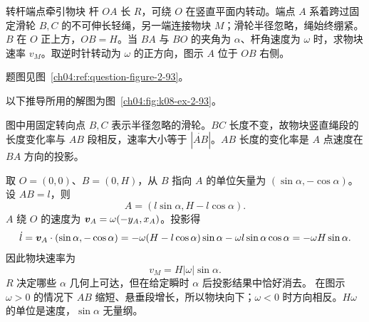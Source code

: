 {\begin{origexamplebox}{转杆端点牵引物块}\label{ch04:ex:k08-2-93}
杆 $OA$ 长 $R$，可绕 $O$ 在竖直平面内转动。端点 $A$ 系着跨过固定滑轮 $B,C$ 的不可伸长轻绳，另一端连接物块 $M$；滑轮半径忽略，绳始终绷紧。$B$ 在 $O$ 正上方，$OB=H$。当 $BA$ 与 $BO$ 的夹角为 $\alpha$、杆角速度为 $\omega$ 时，求物块速率 $v_M$。取逆时针转动为 $\omega$ 的正方向，图示 $A$ 位于 $OB$ 右侧。
\par 题图见图~\ref{ch04:ref:question-figure-2-93}。
\KQuestionDP
\end{origexamplebox}
\begin{xesolution}
以下推导所用的解图为图~\ref{ch04:fig:k08-ex-2-93}。

图中用固定转向点 $B,C$ 表示半径忽略的滑轮。$BC$ 长度不变，故物块竖直绳段的长度变化率与 $AB$ 段相反，速率大小等于 $|\dot{AB}|$。$AB$ 长度的变化率是 $A$ 点速度在 $BA$ 方向的投影。
\RodPulleyDiagram

取 $O=(0,0)$、$B=(0,H)$，从 $B$ 指向 $A$ 的单位矢量为 $(\sin\alpha,-\cos\alpha)$。设 $AB=l$，则
\[
A=(l\sin\alpha,H-l\cos\alpha).
\]
$A$ 绕 $O$ 的速度为 $\bm{v}_A=\omega(-y_A,x_A)$。投影得
\[
\dot l=\bm{v}_A\cdot(\sin\alpha,-\cos\alpha)
=-\omega(H-l\cos\alpha)\sin\alpha
-\omega l\sin\alpha\cos\alpha
=-\omega H\sin\alpha.
\]
因此物块速率为
\[
\boxed{v_M=H|\omega|\sin\alpha}.
\]
$R$ 决定哪些 $\alpha$ 几何上可达，但在给定瞬时 $\alpha$ 后投影结果中恰好消去。
在图示 $\omega>0$ 的情况下 $AB$ 缩短、悬垂段增长，所以物块向下；$\omega<0$ 时方向相反。$H\omega$ 的单位是速度，$\sin\alpha$ 无量纲。
\end{xesolution}
}

